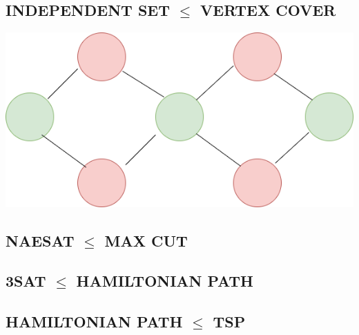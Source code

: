 \documentclass{article}
\begin{document}
\subsection{INDEPENDENT SET $\le$ VERTEX COVER}
\includegraphics[scale=0.5]{IStoCOVER}
\subsection{NAESAT $\le$ MAX CUT}
\subsection{3SAT $\le$ HAMILTONIAN PATH}
\subsection{HAMILTONIAN PATH $\le$ TSP}
\end{document}
